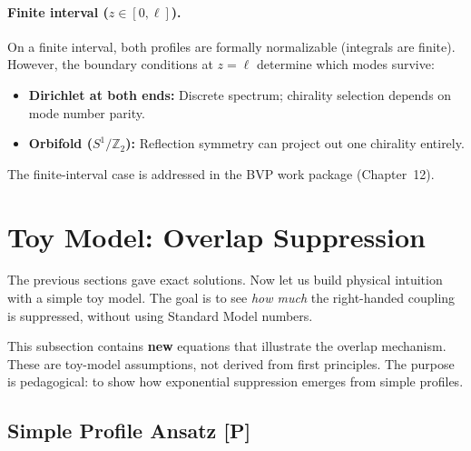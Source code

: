 \paragraph{Finite interval ($z \in [0, \ell]$).}
On a finite interval, both profiles are formally normalizable (integrals are finite).
However, the boundary conditions at $z = \ell$ determine which modes survive:
\begin{itemize}[nosep]
    \item \textbf{Dirichlet at both ends:} Discrete spectrum; chirality selection
          depends on mode number parity.
    \item \textbf{Orbifold ($S^1/\mathbb{Z}_2$):} Reflection symmetry can project
          out one chirality entirely.
\end{itemize}
The finite-interval case is addressed in the BVP work package (Chapter~12).

\begin{center}
\end{center}

\section{Toy Model: Overlap Suppression}
\label{sec:ch9_toy_model}

The previous sections gave exact solutions. Now let us build physical intuition
with a simple toy model. The goal is to see \emph{how much} the right-handed
coupling is suppressed, without using Standard Model numbers.

\begin{tcolorbox}[colback=gray!5, colframe=gray!50!black,
    title=\textbf{Toy Model Disclaimer}]
This subsection contains \textbf{new} equations that illustrate the overlap
mechanism. These are \tagP{} toy-model assumptions, not derived from first
principles. The purpose is pedagogical: to show how exponential suppression
emerges from simple profiles.
\end{tcolorbox}

\subsection{Simple Profile Ansatz [P]}

